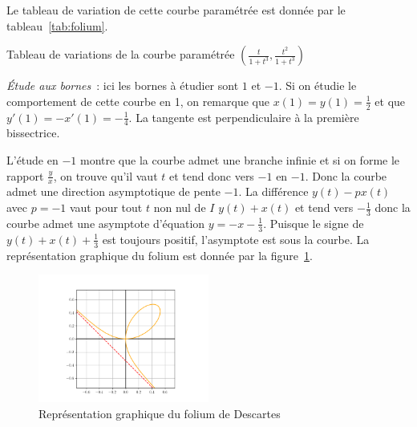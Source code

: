 Le tableau de variation de cette courbe paramétrée est donnée par le tableau~\ref{tab:folium}.

\begin{table}
\centering
\caption{Tableau de variations de la courbe paramétrée \(\left(\frac{t}{1+t^3},\frac{t^2}{1+t^3}\right)\)}
\label{tab:folium}
\end{table}

\emph{Étude aux bornes}~:
ici les bornes à étudier sont \(1\) et \(-1\). Si on étudie le comportement de cette courbe en 1, on remarque que \(x(1)=y(1)=\frac{1}{2}\) et que \(y'(1)=-x'(1)=-\frac{1}{4}\). La tangente est perpendiculaire à la première bissectrice.

L'étude en \(-1\) montre que la courbe admet une branche infinie et si on forme le rapport \(\frac{y}{x}\), on trouve qu'il vaut \(t\) et tend donc vers \(-1\) en \(-1\). Donc la courbe admet une direction asymptotique de pente \(-1\). La différence \(y(t)-px(t)\) avec \(p=-1\) vaut pour tout \(t\) non nul de \(I\) \(y(t)+x(t)\) et tend vers \(-\frac{1}{3}\) donc la courbe admet une asymptote d'équation \(y=-x-\frac{1}{3}\). Puisque le signe de \(y(t)+x(t)+\frac{1}{3}\) est toujours positif, l'asymptote est sous la courbe. La représentation graphique du folium est donnée par la figure~\ref{fig:folium}.
\begin{figure}
 \centering
 \includegraphics[width=0.5\textwidth, scale=1]{folium.png}
 \caption{Représentation graphique du folium de Descartes}
 \label{fig:folium}
\end{figure}

